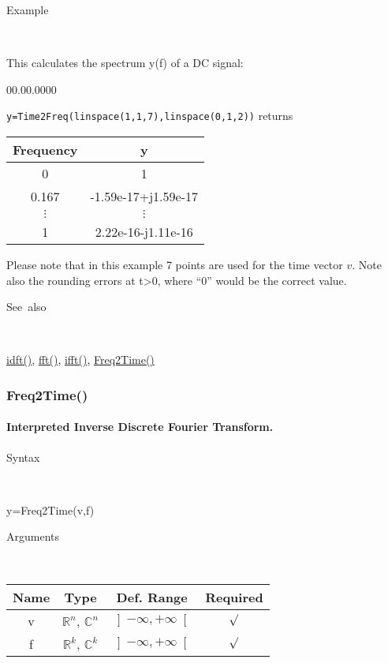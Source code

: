 \begin{description}
\item [Example]~
\end{description}
This calculates the spectrum y(f) of a DC signal:

\begin{lyxlist}{00.00.0000}
\item [\texttt{y=Time2Freq(linspace(1,1,7),linspace(0,1,2))}]returns\\

\begin{tabular}{|c|c|}
\hline 
Frequency&
y\tabularnewline
\hline
\hline 
0&
1\tabularnewline
\hline 
0.167&
-1.59e-17+j1.59e-17\tabularnewline
\hline 
$\vdots$&
$\vdots$\tabularnewline
\hline 
1&
2.22e-16-j1.11e-16\tabularnewline
\hline
\end{tabular}
\end{lyxlist}
Please note that in this example 7 points are used for the time vector
$v$.  Note also the rounding errors at t>0, where {}``0'' would be the
correct value.

\begin{description}
\item [See~also]~
\end{description}
\textcolor{blue}{\hyperlink{idft}{idft()}}\textcolor{black}{,} \textcolor{blue}{\hyperlink{fft}{fft()}}\textcolor{black}{,}
\textcolor{blue}{\hyperlink{ifft}{ifft()}}\textcolor{black}{,}
\textcolor{blue}{\hyperlink{Freq2Time}{Freq2Time()}}

\newpage
\subsubsection*{\hypertarget{Freq2Time}{}{\Large Freq2Time()}}


\paragraph{\label{par:Interpreted-Inverse-Discrete-Fourier}Interpreted Inverse Discrete Fourier Transform.}

\begin{description}
\item [Syntax]~
\end{description}
y=Freq2Time(v,f)

\begin{description}
\item [Arguments]~
\end{description}
\begin{tabular}{|c|c|c|c|}
\hline 
Name&
Type&
Def. Range&
Required\tabularnewline
\hline
\hline 
v&
$\mathbb{R}^{n}$, $\mathbb{C}^{n}$&
$\left]-\infty,+\infty\right[$&
$\surd$\tabularnewline
\hline 
f&
$\mathbb{R}^{k}$, $\mathbb{C}^{k}$&
$\left]-\infty,+\infty\right[$&
$\surd$\tabularnewline
\hline
\end{tabular}

